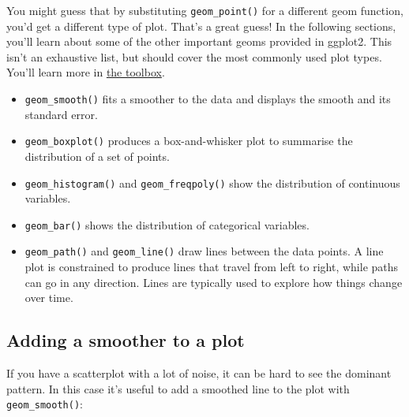 
You might guess that by substituting \texttt{geom\_point()} for a
different geom function, you'd get a different type of plot. That's a
great guess! In the following sections, you'll learn about some of the
other important geoms provided in ggplot2. This isn't an exhaustive
list, but should cover the most commonly used plot types. You'll learn
more in \hyperref[cha:toolbox]{the toolbox}.

\begin{itemize}
\item
  \texttt{geom\_smooth()} fits a smoother to the data and displays the
  smooth and its standard error.
\item
  \texttt{geom\_boxplot()} produces a box-and-whisker plot to summarise
  the distribution of a set of points.
\item
  \texttt{geom\_histogram()} and \texttt{geom\_freqpoly()} show the
  distribution of continuous variables.
\item
  \texttt{geom\_bar()} shows the distribution of categorical variables.
\item
  \texttt{geom\_path()} and \texttt{geom\_line()} draw lines between the
  data points. A line plot is constrained to produce lines that travel
  from left to right, while paths can go in any direction. Lines are
  typically used to explore how things change over time.
\end{itemize}

\subsection{Adding a smoother to a plot}\label{sub:smooth}

If you have a scatterplot with a lot of noise, it can be hard to see the
dominant pattern. In this case it's useful to add a smoothed line to the
plot with \texttt{geom\_smooth()}: 

\begin{Shaded}
\begin{Highlighting}[]
\StringTok{ }
\StringTok{  }\NormalTok{() +}\StringTok{ }
\StringTok{  }\NormalTok{()}
\end{Highlighting}
\end{Shaded}

